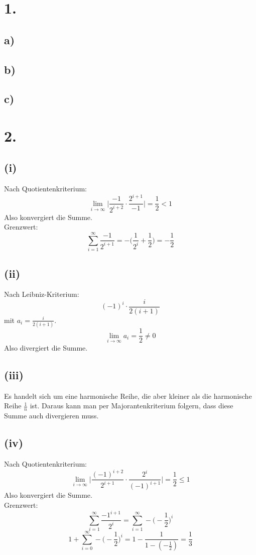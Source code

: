 \documentclass[a4paper]{scrartcl}
\title{\titleinfo}
\author{Elena Noll, Sven-Hendrik Haase, Arne Struck}
\date{\today}
\begin{document}
\maketitle
\notag

\section{1.}
\subsection{a)}
\subsection{b)}
\subsection{c)}

\section{2.}
\subsection{(i)}
Nach Quotientenkriterium:
\[ \lim_{i\to\infty} \bigg|\frac {-1} {2^{i+2}} \cdot \frac {2^{i+1}} {-1}\bigg| = \frac 1 2 < 1 \]
Also konvergiert die Summe. \\
Grenzwert: 
\[ \sum_{i=1}^\infty \frac {-1} {2^{i+1}} = - \Big(\frac 1 {2^i} + \frac 1 2 \Big) = - \frac 1 2 \]

\subsection{(ii)}
Nach Leibniz-Kriterium:
\[ (-1)^i \cdot \frac i {2(i+1)} \]
mit \(a_i = \frac i {2(i+1)} \).
\[ \lim_{i\to\infty} a_i = \frac 1 2 \neq 0 \]
Also divergiert die Summe.

\subsection{(iii)}
Es handelt sich um eine harmonische Reihe, die aber kleiner als die harmonische Reihe \( \frac 1 n \) ist. Daraus kann man per Majorantenkriterium folgern, dass diese Summe auch divergieren muss.

\subsection{(iv)}
Nach Quotientenkriterium:
\[ \lim_{i\to\infty} \bigg| \frac {(-1)^{i+2}} {2^{i+1}} \cdot \frac {2^i} {(-1)^{i+1}} \bigg| = \frac 1 2 \le 1 \]
Also konvergiert die Summe. \\
Grenzwert:
\[ \sum_{i=1}^\infty \frac {{-1}^{i+1}} {2^i} = \sum_{i=1}^\infty -\Big(-\frac 1 2\Big)^i \]
\[ 1+\sum_{i=0}^\infty -\Big(-\frac 1 2\Big)^i = 1 -\frac 1 {1-(-\frac 1 2)} = \frac 1 3 \]
\end{document}

